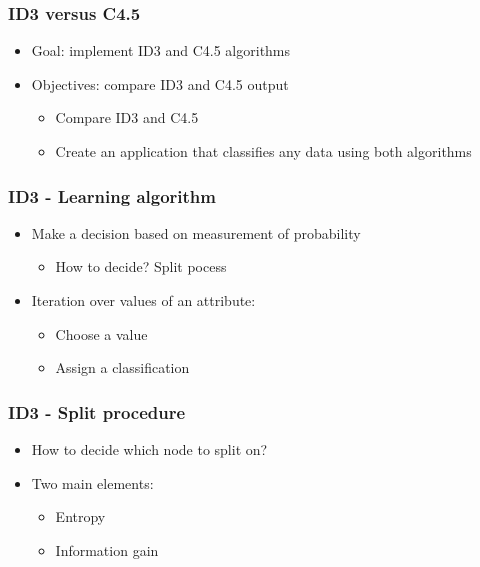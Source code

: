 \documentclass{beamer}
\begin{document}
\begin{frame}
\frametitle{ID3 versus C4.5}
	\begin{itemize}
		\item Goal: implement ID3 and C4.5 algorithms
		\vfill
		\item Objectives: compare ID3 and C4.5 output
		\vfill
		\begin{itemize}
			\item Compare ID3 and C4.5
			\vfill
			\item Create an application that classifies any data using both algorithms
		\end{itemize}

	\end{itemize}

\end{frame}


\begin{frame}
\frametitle{ID3 - Learning algorithm}
\begin{itemize}
		\item  Make a decision based on measurement of probability
		\begin{itemize}
			\item How to decide? Split pocess
		\end{itemize}
		\item Iteration over values of an attribute:
		\begin{itemize}
			\item Choose a value
			\item Assign a classification
		\end{itemize}

	\end{itemize}
\end{frame}

\begin{frame}
\frametitle{ID3 - Split procedure}
\begin{itemize}
		\item  How to decide which node to split on? 
		\item Two main elements:
		\begin{itemize}
			\item Entropy
			\item Information gain
		\end{itemize}

	\end{itemize}
\end{frame}
\end{document}
